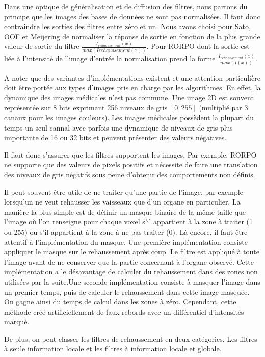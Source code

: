 Dans une optique de généralisation et de diffusion des filtres, nous partons du principe que les images des bases de données ne sont pas normalisées. Il faut donc contraindre les sorties des filtres entre zéro et un. Nous avons choisi pour Sato, OOF et Meijering de normaliser la réponse de sortie en fonction de la plus grande valeur de sortie du filtre $ \frac{I_{rehaussement}(x)} {max(I{rehaussement}(x))} $. Pour RORPO dont la sortie est liée à l'intensité de l'image d'entrée la normalisation prend la forme $ \frac{I_{rehaussement}(x)} {max(I(x))} $.

A noter que des variantes d'implémentations existent et une attention particulière doit être portée aux types d'images pris en charge par les algorithmes. En effet, la dynamique des images médicales n'est pas commune.
Une image 2D est souvent représentée sur 8 bits exprimant 256 niveaux de gris $[0,255]$ (multiplié par 3 canaux pour les images couleurs). Les images médicales possèdent la plupart du temps un seul cannal avec parfois une dynamique de niveaux de gris plus importante de 16 ou 32 bits et peuvent présenter des valeurs négatives.

Il faut donc s'assurer que les filtres supportent les images. Par exemple, RORPO ne supporte que des valeurs de pixels positifs et nécessite de faire une translation des niveaux de gris négatifs sous peine d'obtenir des comportements non définis.

Il peut souvent être utile de ne traiter qu'une partie de l'image, par exemple lorsqu'un ne veut rehausser les vaisseaux que d'un organe en particulier. La manière la plus simple est de définir un masque binaire de la même taille que l'image où l'on renseigne pour chaque voxel s'il appartient à la zone à traiter (1 ou 255) ou s'il appartient à la zone à ne pas traiter (0). Là encore, il faut être attentif à l'implémentation du masque. Une première implémentation consiste appliquer le masque sur le rehaussement après coup. Le filtre est appliqué à toute l'image avant de ne conserver que la partie concernant à l'organe observé. Cette implémentation a le désavantage de calculer du rehaussement dans des zones non utilisées par la suite.Une seconde implémentation consiste à masquer l'image dans un premier temps, puis de calculer le rehaussement dans cette image masquée. On gagne ainsi du temps de calcul dans les zones à zéro. Cependant, cette méthode créé artificiellement de faux rebords avec un différentiel d'intensités marqué.

De plus, on peut classer les filtres de rehaussement en deux catégories. Les filtres à seule information locale et les filtres à information locale et globale.


